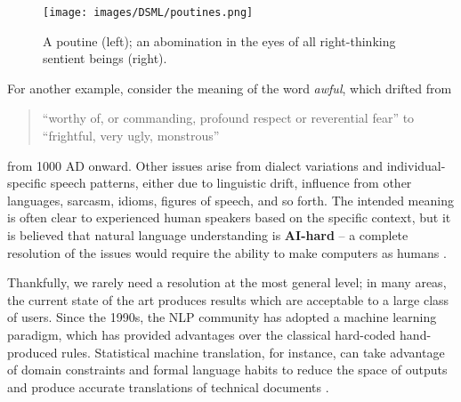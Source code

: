\begin{figure}\centering \texttt{[image: images/DSML/poutines.png]}\caption[\small Poutines]{\small A poutine (left); an abomination in the eyes of all right-thinking sentient beings (right).}\label{fig:poutine} \end{figure} For another example, consider the meaning of the word \textit{awful}, which drifted from  
\begin{quote}
``worthy of, or commanding, profound respect or reverential fear'' to ``frightful, very ugly, monstrous''
\end{quote}
from 1000 AD onward. Other issues arise from dialect variations and individual-specific speech patterns, either due to linguistic drift, influence from other languages, sarcasm, idioms, figures of speech, and so forth. The intended meaning is often clear to experienced human speakers based on the specific context, but it is believed that natural language understanding is \textbf{AI-hard}  -- a complete resolution of the issues would require the ability to make computers as humans \cite{TM_IV}. \par Thankfully, we rarely need a resolution at the most general level; in many areas, the current state of the art produces results which are acceptable to a large class of users. Since the 1990s, the NLP community has adopted a machine learning paradigm, which has provided advantages over the classical hard-coded hand-produced rules. Statistical machine translation, for instance, can take advantage of domain constraints and formal language habits to reduce the space of outputs and produce accurate translations of technical documents \cite{TM_WG}.  

